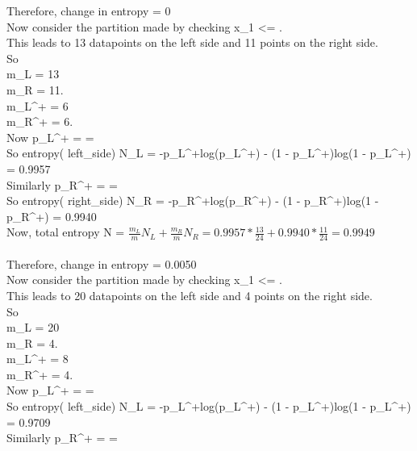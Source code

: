 \documentclass[twoside,10pt,a4paper]{article}
\theoremstyle{definition}
\theoremstyle{definition}
\theoremstyle{remark}
\renewcommand{\>}{{\rightarrow}}
\newcommand{\1}{{\mathbf 1}}
\newcommand{\0}{{\mathbf 0}}
\begin{document}
Therefore, change in entropy = 0\\

Now consider the partition made by checking x_1 <= .\\

This leads to 13 datapoints on the left side and 11 points on the right side.\\

So \\
m_L = 13 \\
m_R = 11.\\
m_L^+ = 6 \\
m_R^+ = 6.\\

Now
p_L^+ =  =  \\

So
entropy( left\_side) N_L = -p_L^+log(p_L^+) - (1 - p_L^+)log(1 - p_L^+) = 0.9957\\

Similarly
p_R^+ =  =  \\

So
entropy( right\_side) N_R = -p_R^+log(p_R^+) - (1 - p_R^+)log(1 - p_R^+) = 0.9940\\

Now, total entropy N = $\frac{ m_L }{ m } N_L + \frac{m_R}{m} N_R = 0.9957 * \frac{13}{24} + 0.9940 * \frac{11}{24} = 0.9949$\\ ~\\

Therefore, change in entropy = 0.0050\\

Now consider the partition made by checking x_1 <= .\\

This leads to 20 datapoints on the left side and 4 points on the right side.\\

So \\
m_L = 20 \\
m_R = 4.\\
m_L^+ = 8 \\
m_R^+ = 4.\\

Now
p_L^+ =  =  \\

So
entropy( left\_side) N_L = -p_L^+log(p_L^+) - (1 - p_L^+)log(1 - p_L^+) = 0.9709\\

Similarly
p_R^+ =  =  \\
\end{document}
